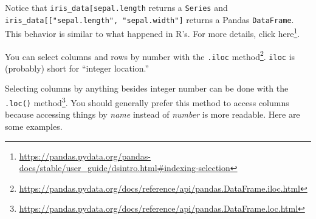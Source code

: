 \documentclass[
  12pt,
]{krantz}
\makeatletter
\newenvironment{Shaded}{\begin{snugshade}}{\end{snugshade}}
\newcommand{\CommentTok}[1]{\textcolor[rgb]{0.37,0.37,0.37}{\textit{#1}}}
\newcommand{\DecValTok}[1]{\textcolor[rgb]{0.06,0.06,0.06}{#1}}
\newcommand{\NormalTok}[1]{#1}
\newcommand{\OperatorTok}[1]{\textcolor[rgb]{0.43,0.43,0.43}{\textbf{#1}}}
\renewcommand{\href}[2]{#2\footnote{\url{#1}}}
\newenvironment{kframe}{%
\medskip{}
\setlength{\fboxsep}{.8em}
 \def\at@end@of@kframe{}%
 \ifinner\ifhmode%
  \def\at@end@of@kframe{\end{minipage}}%
  \begin{minipage}{\columnwidth}%
 \fi\fi%
 \def\FrameCommand##1{\hskip\@totalleftmargin \hskip-\fboxsep
 \colorbox{shadecolor}{##1}\hskip-\fboxsep
     \hskip-\linewidth \hskip-\@totalleftmargin \hskip\columnwidth}%
 \MakeFramed {\advance\hsize-\width
   \@totalleftmargin\z@ \linewidth\hsize
   \@setminipage}}%
 {\par\unskip\endMakeFramed%
 \at@end@of@kframe}
\renewenvironment{Shaded}{\begin{kframe}}{\end{kframe}}
\makeatother
\begin{document}
Notice that \texttt{iris\_data{[}\textquotesingle{}sepal.length\textquotesingle{}{]}} returns a \texttt{Series} and \texttt{iris\_data{[}{[}"sepal.length",\ "sepal.width"{]}} returns a Pandas \texttt{DataFrame}. This behavior is similar to what happened in R's. For more details, click \href{https://pandas.pydata.org/pandas-docs/stable/user_guide/dsintro.html\#indexing-selection}{here}.

You can select columns and rows by number with the \href{https://pandas.pydata.org/docs/reference/api/pandas.DataFrame.iloc.html}{\texttt{.iloc} method}. \texttt{iloc} is (probably) short for ``integer location.''

\begin{Shaded}
\end{Shaded}

Selecting columns by anything besides integer number can be done with the \href{https://pandas.pydata.org/docs/reference/api/pandas.DataFrame.loc.html}{\texttt{.loc()} method}. You should generally prefer this method to access columns because accessing things by \emph{name} instead of \emph{number} is more readable. Here are some examples.
\end{document}
